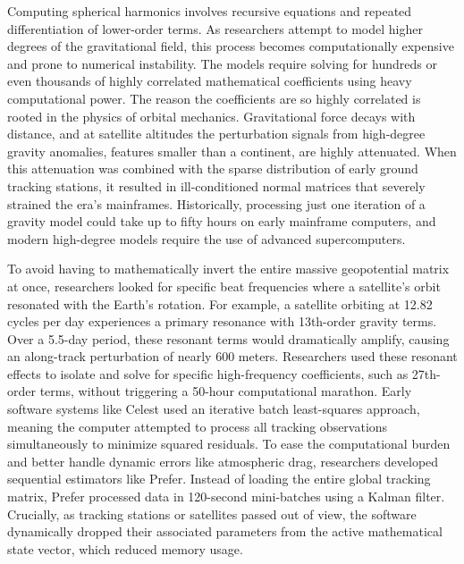 Computing spherical harmonics involves recursive equations and repeated differentiation of lower-order terms. As researchers attempt to model higher degrees of the gravitational field, this process becomes  computationally expensive and prone to numerical instability. The models require solving for hundreds or even thousands of highly correlated mathematical coefficients using heavy computational power. The reason the coefficients are so highly correlated is rooted in the physics of orbital mechanics. Gravitational force decays with distance, and at satellite altitudes the perturbation signals from high-degree gravity anomalies, features smaller than a continent, are highly attenuated. When this attenuation was combined with the sparse distribution of early ground tracking stations, it resulted in ill-conditioned normal matrices that severely strained the era’s mainframes. Historically, processing just one iteration of a gravity model could take up to fifty hours on early mainframe computers, and modern high-degree models require the use of advanced supercomputers.

To avoid having to mathematically invert the entire massive geopotential matrix at once, researchers looked for specific beat frequencies where a satellite's orbit resonated with the Earth's rotation. For example, a satellite orbiting at 12.82 cycles per day experiences a primary resonance with 13th-order gravity terms. Over a 5.5-day period, these resonant terms would dramatically amplify, causing an along-track perturbation of nearly 600 meters. Researchers used these resonant effects to isolate and solve for specific high-frequency coefficients, such as 27th-order terms, without triggering a 50-hour computational marathon. Early software systems like Celest used an iterative batch least-squares approach, meaning the computer attempted to process all tracking observations simultaneously to minimize squared residuals. To ease the computational burden and better handle dynamic errors like atmospheric drag, researchers developed sequential estimators like Prefer. Instead of loading the entire global tracking matrix, Prefer processed data in 120-second mini-batches using a Kalman filter. Crucially, as tracking stations or satellites passed out of view, the software dynamically dropped their associated parameters from the active mathematical state vector, which reduced memory usage.

